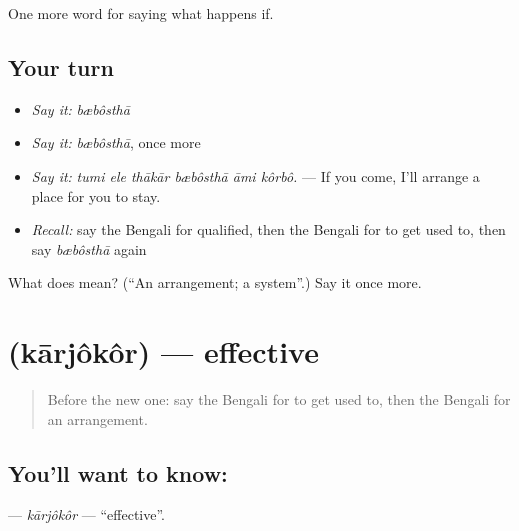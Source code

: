 \begin{grammarlens}[title={What you've built}]
One more word for saying what happens if.
\end{grammarlens}

\subsection*{Your turn}
\begin{itemize}
\raggedright
  \item \emph{Say it:} \emph{bæbôsthā}
  \item \emph{Say it:} \emph{bæbôsthā}, once more
  \item \emph{Say it:} \emph{tumi ele thākār bæbôsthā āmi kôrbô.} — If you come, I'll arrange a place for you to stay.
  \item \emph{Recall:} say the Bengali for qualified, then the Bengali for to get used to, then say \emph{bæbôsthā} again
\end{itemize}

\begin{tcolorbox}[breakable,colback=teal!4,colframe=teal!35!black,title={Before you move on}]
What does  mean? (\textquotedblleft{}An arrangement; a system\textquotedblright{}.) Say it once more.
\end{tcolorbox}
\section[\texorpdfstring{\bn{কার্যকর} (kārjôkôr)}{কার্যকর (kārjôkôr)}]{ (kārjôkôr) — effective}

\label{lesson:BN-C381-karjokor}



\begin{quote}
Before the new one: say the Bengali for to get used to, then the Bengali for an arrangement.
\end{quote}

\subsection*{You'll want to know: }
\textbf{} — \emph{kārjôkôr} — \textquotedblleft{}effective\textquotedblright{}.

\begin{quote}
        
\end{quote}

